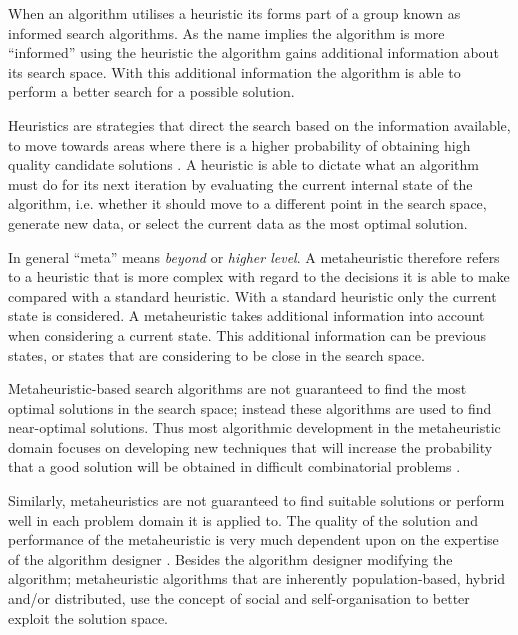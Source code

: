 When an algorithm utilises a heuristic its forms part of a group known as informed search algorithms. As the name implies the algorithm is more ``informed'' using the heuristic the algorithm gains additional information about its search space. With this additional information the algorithm is able to perform a better search for a possible solution\cite{AIModernApproach}.

Heuristics are strategies that direct the search based on the information available, to move towards areas where there is a higher probability of obtaining high quality candidate solutions \cite{AIModernApproach}. A heuristic is able to dictate what an algorithm must do for its next iteration by evaluating the current internal state of the algorithm, i.e. whether it should move to a different point in the search space, generate new data, or select the current data as the most optimal solution\cite{AIModernApproach,NatureInspiredMetaHeuristic}. 

In general ``meta'' means \emph{beyond} or \emph{higher level}\cite{AIModernApproach,NatureInspiredMetaHeuristic}. A metaheuristic therefore refers to a heuristic that is more complex with regard to the decisions it is able to make compared with a standard heuristic\cite{AIModernApproach,NatureInspiredMetaHeuristic}. With a standard heuristic only the current state is considered\cite{AIModernApproach}. A metaheuristic takes additional information into account when considering a current state\cite{NatureInspiredMetaHeuristic}. This additional information can be previous states, or states that are considering to be close in the search space\cite{AIModernApproach, NatureInspiredMetaHeuristic}.

Metaheuristic-based search algorithms are not guaranteed to find the most optimal solutions in the search space; instead these algorithms are used to find near-optimal solutions. Thus most algorithmic development in the metaheuristic domain focuses on developing new techniques that will increase the probability that a good solution will be obtained in difficult combinatorial problems \cite{MetaAgricultural}.

Similarly, metaheuristics are not guaranteed to find suitable solutions or perform well in each problem domain it is applied to. The quality of the solution and performance of the metaheuristic is very much dependent upon on the expertise of the algorithm designer \cite{AutoComplexMeta}. Besides the algorithm designer modifying the algorithm; metaheuristic algorithms that are inherently population-based, hybrid and/or distributed, use the concept of social and self-organisation to better exploit the solution space\cite{Self-AdaptiveMeta}.

